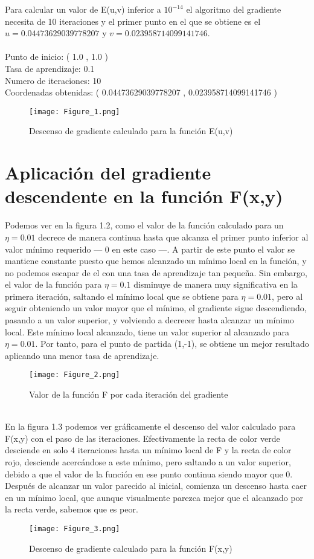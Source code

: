 Para calcular un valor de E(u,v) inferior a $ 10^{-14} $ el algoritmo del gradiente necesita de 10 iteraciones y el primer punto en el que se obtiene es el $ u =  0.04473629039778207 $ y $ v =  0.023958714099141746 $.\\
\\
Punto de inicio: ( 1.0 ,  1.0 )\\
Tasa de aprendizaje:  0.1\\
Numero de iteraciones:  10\\
Coordenadas obtenidas: ( 0.04473629039778207 ,  0.023958714099141746 )\\

\begin{figure}[h]
   \centering
   \texttt{[image: Figure\_1.png]}
   \caption{Descenso de gradiente calculado para la función E(u,v)}
\end{figure}
\newpage
\section{Aplicación del gradiente descendente en la función F(x,y)}
Podemos ver en la figura 1.2, como el valor de la función calculado para un $ \eta = 0.01 $ decrece de manera continua hasta que alcanza el primer punto inferior al valor mínimo requerido --- 0 en este caso ---. A partir de este punto el valor se mantiene constante puesto que hemos alcanzado un mínimo local en la función, y no podemos escapar de el con una tasa de aprendizaje tan pequeña. Sin embargo, el valor de la función para $ \eta = 0.1 $ disminuye de manera muy significativa en la primera iteración, saltando el mínimo local que se obtiene para $ \eta = 0.01 $, pero al seguir obteniendo un valor mayor que el mínimo, el gradiente sigue descendiendo, pasando a un valor superior, y volviendo a decrecer hasta alcanzar un mínimo local. Este mínimo local alcanzado, tiene un valor superior al alcanzado para $ \eta = 0.01 $. Por tanto, para el punto de partida (1,-1), se obtiene un mejor resultado aplicando una menor tasa de aprendizaje.
\begin{figure}[h]
   \centering
   \texttt{[image: Figure\_2.png]}
   \caption{Valor de la función F por cada iteración del gradiente}
\end{figure}
\\
En la figura 1.3 podemos ver gráficamente el descenso del valor calculado para F(x,y) con el paso de las iteraciones. Efectivamente la recta de color verde desciende en solo 4 iteraciones hasta un mínimo local de F y la recta de color rojo, desciende acercándose a este mínimo, pero saltando a un valor superior, debido a que el valor de la función en ese punto continua siendo mayor que 0. Después de alcanzar un valor parecido al inicial, comienza un descenso hasta caer en un mínimo local, que aunque visualmente parezca mejor que el alcanzado por la recta verde, sabemos que es peor.
\newpage
\begin{figure}[h]
   \centering
   \caption{Descenso de gradiente calculado para la función F(x,y)}
   \texttt{[image: Figure\_3.png]}
\end{figure}

